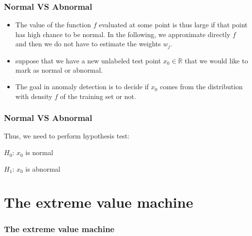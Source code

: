\documentclass{beamer}
\begin{document}
\begin{frame}
    \frametitle{Normal VS Abnormal}
    \begin{itemize}
        \item  The value of the function $f$ evaluated at some point is thus large if that point has high chance to be normal. In the following, we approximate directly $f$ and then we do not have to estimate the weights $w_j$.
        \item suppose that we have a new unlabeled test point $x_0\in \mathbb{R}$ that we would like to mark as normal or abnormal.
        \item The goal in anomaly detection is to decide if $x_0$ comes from the distribution with density $f$ of the training set or not. 
    \end{itemize}
\end{frame}

\begin{frame}
    \frametitle{Normal VS Abnormal}
    Thus, we need to perform hypothesis test:
    \begin{center}
        \bigskip
        $H_0$: $x_0$ is normal 

        \bigskip
        $H_1$: $x_0$ is abnormal
    \end{center}
    

\end{frame}

\section{The extreme value machine}
\begin{frame}
    \frametitle{The extreme value machine}

    

\end{frame}
\end{document}
